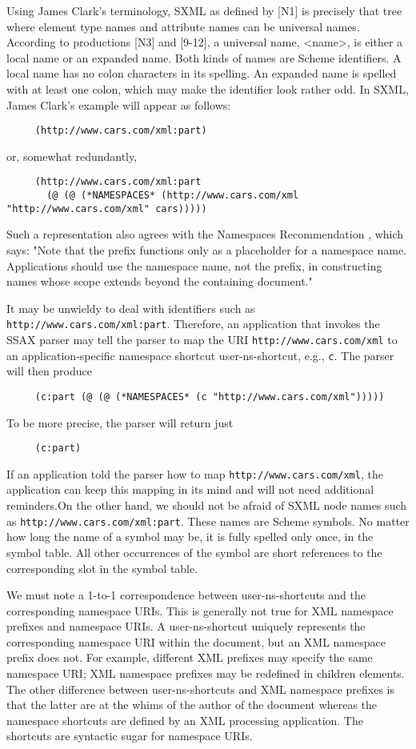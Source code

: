 \documentclass[10pt]{article}
\begin{document}
Using James Clark's terminology, SXML as defined by [N1] is
precisely that tree where element type names and attribute names can
be universal names.  According to productions [N3] and [9-12], a
universal name, <name>, is either a local name or an expanded
name. Both kinds of names are Scheme identifiers. A local name has no
colon characters in its spelling. An expanded name is spelled with at
least one colon, which may make the identifier look rather odd. In
SXML, James Clark's example will appear as follows:\begin{verbatim}
     (http://www.cars.com/xml:part)
\end{verbatim}
or, somewhat redundantly, \begin{verbatim}
     (http://www.cars.com/xml:part
       (@ (@ (*NAMESPACES* (http://www.cars.com/xml "http://www.cars.com/xml" cars)))))
\end{verbatim}


Such a representation also agrees with the Namespaces Recommendation \cite{XML-Namespaces}, which says: "Note that the prefix
functions only as a placeholder for a namespace name. Applications
should use the namespace name, not the prefix, in constructing names
whose scope extends beyond the containing document."

It may be unwieldy to deal with identifiers such as \texttt{http://www.cars.com/xml:part}. Therefore, an application that
invokes the SSAX parser may tell the parser to map the URI \texttt{http://www.cars.com/xml} to an application-specific namespace shortcut user-ns-shortcut, e.g., \texttt{c}. The parser will then produce\begin{verbatim}
     (c:part (@ (@ (*NAMESPACES* (c "http://www.cars.com/xml")))))
\end{verbatim}
To be more precise, the parser will return just\begin{verbatim}
     (c:part)
\end{verbatim}
If an application told the parser how to map \texttt{http://www.cars.com/xml}, the application can keep this mapping in
its mind and will not need additional reminders.On the other hand, we should not be afraid of SXML node
names such as \texttt{http://www.cars.com/xml:part}. These names
are Scheme symbols. No matter how long the name of a symbol may be, it
is fully spelled only once, in the symbol table. All other occurrences
of the symbol are short references to the corresponding slot in
the symbol table.



We must note a 1-to-1 correspondence between user-ns-shortcuts and the corresponding namespace URIs. This is
generally not true for XML namespace prefixes and namespace URIs. A
user-ns-shortcut uniquely represents the
corresponding namespace URI within the document, but an XML namespace
prefix does not. For example, different XML prefixes may specify the
same namespace URI; XML namespace prefixes may be redefined in
children elements. The other difference between user-ns-shortcuts and XML namespace prefixes is that the latter
are at the whims of the author of the document whereas the namespace
shortcuts are defined by an XML processing application. The shortcuts
are syntactic sugar for namespace URIs.
\end{document}
